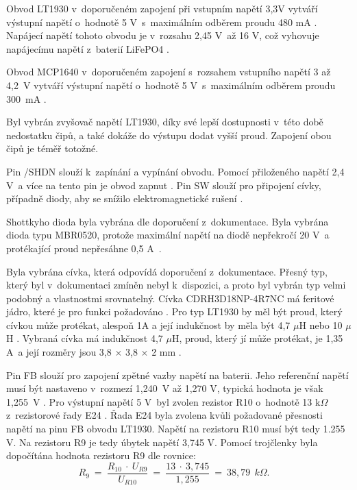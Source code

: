 Obvod LT1930 v~doporučeném zapojení při vstupním napětí 3,3V vytváří výstupní napětí o~hodnotě 5 V~s~maximálním odběrem proudu 480 mA \cite{LT1930_dtsh}. Napájecí napětí 
tohoto obvodu je v~rozsahu 2,45 V~až 16 V, což vyhovuje napájecímu napětí z~baterií LiFePO4 \cite{LT1930_dtsh}.

Obvod MCP1640 v~doporučeném zapojení s~rozsahem vstupního napětí 3 až 4,2~V vytváří výstupní napětí o~hodnotě 5 V~s~maximálním odběrem proudu 300~mA \cite{MCP1640_dtsh}.

Byl vybrán zvyšovač napětí LT1930, díky své lepší dostupnosti v~této době nedostatku čipů, a také dokáže do výstupu dodat vyšší proud. Zapojení obou čipů je téměř totožné. 

Pin /SHDN slouží k~zapínání a vypínání obvodu. Pomocí přiloženého napětí 2,4 V~a více na tento pin je obvod zapnut \cite{LT1930_dtsh}. Pin SW slouží pro  připojení cívky, 
případně diody, aby se snížilo elektromagnetické rušení \cite{LT1930_dtsh}. 

Shottkyho dioda byla vybrána dle doporučení z~dokumentace. Byla vybrána dioda typu MBR0520, protože maximální napětí na diodě nepřekročí 20 V~a protékající proud nepřesáhne 
0,5 A~\cite{LT1930_dtsh}.

Byla vybrána cívka, která odpovídá doporučení z~dokumentace. Přesný typ, který byl v~dokumentaci zmíněn nebyl k~dispozici, a proto byl vybrán typ velmi podobný a vlastnostmi 
srovnatelný. Cívka CDRH3D18NP-4R7NC má feritové jádro, které je pro funkci požadováno \cite{LT1930_dtsh}. Pro typ LT1930 by měl být proud, který cívkou může protékat, alespoň
1A a její indukčnost by měla být 4,7 $\mu$H nebo 10 $\mu$H \cite{LT1930_dtsh}. Vybraná cívka má indukčnost 4,7 $\mu$H, proud, který jí může protékat, je 1,35 A~a její rozměry 
jsou 3,8 $\times$ 3,8 $\times$ 2 mm \cite{civka_dtsh}.

Pin FB slouží  pro zapojení zpětné vazby napětí na baterii. Jeho referenční napětí musí být nastaveno v~rozmezí 1,240~V až 1,270 V, typická hodnota je však 1,255~V \cite{LT1930_dtsh}. 
Pro výstupní napětí 5 V~byl zvolen rezistor R10 o~hodnotě 13 k$\Omega$ z~rezistorové řady E24 \cite{rezistorova_rada}. Řada E24 byla zvolena kvůli požadované přesnosti
napětí na pinu FB obvodu LT1930. Napětí na rezistoru R10 musí být tedy 1.255 V. Na rezistoru R9 je tedy úbytek napětí 3,745 V. Pomocí trojčlenky byla dopočítána hodnota 
rezistoru R9 dle rovnice:
\begin{equation} 
  R_{9}~=~\frac{R_{10}~\cdot~U_{R9}}{U_{R10}}~=~\frac{13~\cdot~3,745}{1,255}~=~38,79~\:k\Omega. 
  \quad
\label{eq:R9}
\end{equation}

